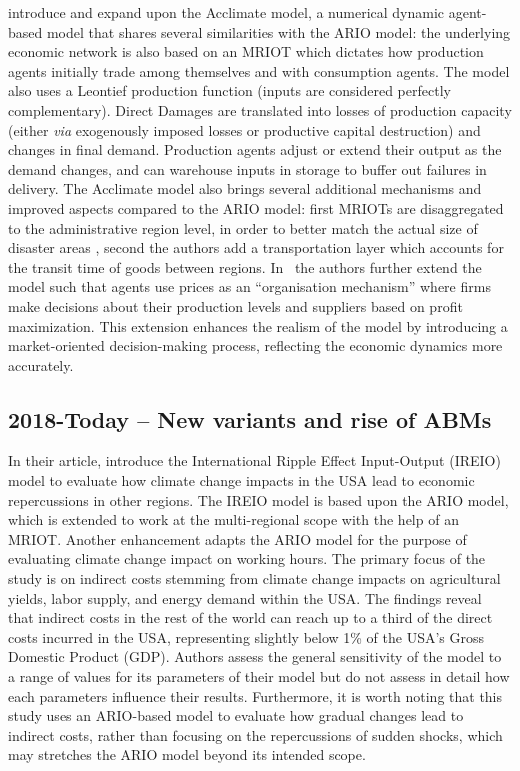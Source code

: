 \Textcite{bierkandt-2014-acclim-model, otto-2017-model-loss} introduce and expand upon the
Acclimate model, a numerical dynamic agent-based model that shares several
similarities with the ARIO model: the underlying economic network is also based on
an MRIOT which dictates how production agents initially trade among themselves and with
consumption agents. The model also uses a Leontief production function (inputs are considered perfectly complementary). Direct Damages are translated into losses
of production capacity (either \emph{via} exogenously imposed losses or productive
capital destruction) and changes in final demand. Production agents adjust or
extend their output as the demand changes, and can warehouse inputs in
storage to buffer out failures in delivery. The Acclimate model also brings
several additional mechanisms and improved aspects compared to the ARIO model:
first MRIOTs are disaggregated to the administrative region level, in order to
better match the actual size of disaster
areas \parencite{wenz-2014-region-sector}, second the authors
add a transportation layer which accounts for the transit time of goods between
regions. In~\textcite{otto-2017-model-loss} the authors further
extend the model such that agents use prices as an ``organisation
mechanism'' where firms make decisions about their production levels and
suppliers based on profit maximization. This extension enhances the realism of
the model by introducing a market-oriented decision-making process, reflecting
the economic dynamics more accurately.

\subsection{2018-Today -- New variants and rise of ABMs}

In their article, \textcite{zhang-2018-analy-econom} introduce
the International Ripple Effect Input-Output (IREIO) model to evaluate how
climate change impacts in the USA lead to economic repercussions in other
regions. The IREIO model is based upon the ARIO model, which is extended to work
at the multi-regional scope with the help of an MRIOT. Another enhancement
adapts the ARIO model for the purpose of evaluating climate change impact on
working hours. The primary focus of the study is on indirect costs stemming from
climate change impacts on agricultural yields, labor supply, and energy demand
within the USA. The findings reveal that indirect costs in the rest of the world
can reach up to a third of the direct costs incurred in the USA, representing
slightly below 1\% of the USA's Gross Domestic Product (GDP).
Authors assess the general sensitivity of the model to a range of values for its
parameters of their model but do not assess in detail how each parameters influence
their results. Furthermore, it is worth noting that this study uses
an ARIO-based model to evaluate how gradual changes lead to indirect costs,
rather than focusing on the repercussions of sudden shocks, which may stretches
the ARIO model beyond its intended scope.


